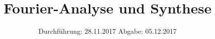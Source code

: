 

\subject{V351}
\title{Fourier-Analyse und Synthese}
\date{%
  Durchführung: 28.11.2017
  \hspace{3em}
  Abgabe: 05.12.2017
}



\maketitle
\thispagestyle{empty}
\tableofcontents
\newpage






\printbibliography{}


